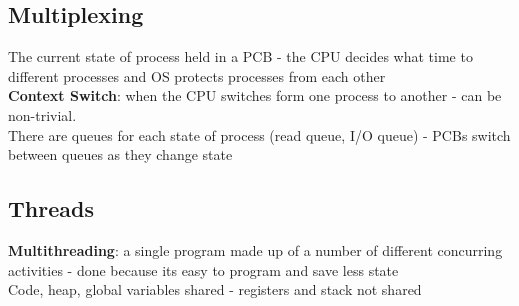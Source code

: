 \documentclass{article}
\begin{document}
\subsection{Multiplexing}
The current state of process held in a PCB - the CPU decides what time to different processes and OS protects processes from each other \\
\textbf{Context Switch}: when the CPU switches form one process to another - can be non-trivial. \\
There are queues for each state of process (read queue, I/O queue) - PCBs switch between queues as they change state \\
\subsection{Threads}
\textbf{Multithreading}: a single program made up of a number of different concurring activities - done because its easy to program and save less state \\
Code, heap, global variables shared - registers and stack not shared 
\end{document}
